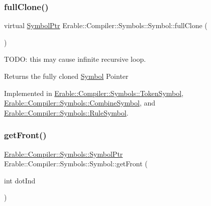\mbox{\label{class_erable_1_1_compiler_1_1_symbols_1_1_symbol_a23ed5c4b948000c29af03c846abc12fc}} 
\subsubsection{\texorpdfstring{fullClone()}{fullClone()}}
{\footnotesize\ttfamily virtual \mbox{\hyperlink{namespace_erable_1_1_compiler_1_1_symbols_a8f0bc762f448ea4d84e8713ab3e140b9}{Symbol\+Ptr}} Erable\+::\+Compiler\+::\+Symbols\+::\+Symbol\+::full\+Clone (\begin{DoxyParamCaption}{ }\end{DoxyParamCaption})\hspace{0.3cm}{\ttfamily [pure virtual]}}

T\+O\+DO\+: this may cause infinite recursive loop. \begin{DoxyReturn}{Returns}
the fully cloned \mbox{\hyperlink{class_erable_1_1_compiler_1_1_symbols_1_1_symbol}{Symbol}} Pointer 
\end{DoxyReturn}


Implemented in \mbox{\hyperlink{class_erable_1_1_compiler_1_1_symbols_1_1_token_symbol_a5907d3f99334de4f74fba1c1598de83a}{Erable\+::\+Compiler\+::\+Symbols\+::\+Token\+Symbol}}, \mbox{\hyperlink{struct_erable_1_1_compiler_1_1_symbols_1_1_combine_symbol_ac20bc8743057e8668bb3871b24dd180d}{Erable\+::\+Compiler\+::\+Symbols\+::\+Combine\+Symbol}}, and \mbox{\hyperlink{class_erable_1_1_compiler_1_1_symbols_1_1_rule_symbol_a23ad141caa8003ab2597cbc8fae841b9}{Erable\+::\+Compiler\+::\+Symbols\+::\+Rule\+Symbol}}.

\mbox{\label{class_erable_1_1_compiler_1_1_symbols_1_1_symbol_af9fa113998ec62ef3e67a6d9a1bd417e}} 
\subsubsection{\texorpdfstring{getFront()}{getFront()}\hspace{0.1cm}{\footnotesize\ttfamily [1/3]}}
{\footnotesize\ttfamily \mbox{\hyperlink{namespace_erable_1_1_compiler_1_1_symbols_a8f0bc762f448ea4d84e8713ab3e140b9}{Erable\+::\+Compiler\+::\+Symbols\+::\+Symbol\+Ptr}} Erable\+::\+Compiler\+::\+Symbols\+::\+Symbol\+::get\+Front (\begin{DoxyParamCaption}\item[{int}]{dot\+Ind }\end{DoxyParamCaption})}


